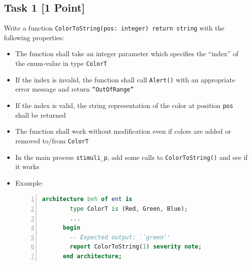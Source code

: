 \documentclass[12pt,epsf,makeidx,oneside]{book}
\begin{document}
\subsection{Task 1 [1 Point]}
  Write a function {\tt ColorToString(pos: integer) return string} with the following properties:
  \begin{itemize}[noitemsep]
    \item The function shall take an integer parameter which specifies the ``index'' of the enum-value in type {\tt ColorT} 
    \item If the index is invalid, the function shall call {\tt Alert()} with an appropriate error message and return {\tt ``OutOfRange''}
    \item If the index is valid, the string representation of the color at position {\tt pos} shall be returned
    \item The function shall work without modification even if colors are added or removed to/from {\tt ColorT}
    \item In the main process {\tt stimuli\_p}, add some calls to {\tt ColorToString()} and see if it works
    \item Example:
    \begin{lstlisting}[language=vhdl,gobble=6,numbers=left]
      architecture beh of ent is
        type ColorT is (Red, Green, Blue);
        ...
      begin
        -- Expected output: ``green''
        report ColorToString(1) severity note; 
      end architecture;
    \end{lstlisting}
  \end{itemize}
\end{document}
